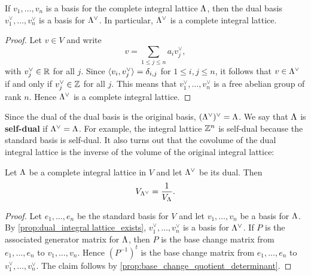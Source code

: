     \begin{proposition}\label{prop:dual_integral lattice_exists}
      If $v_{1},\ldots,v_{n}$ is a basis for the complete integral lattice $\Lambda$, then the dual basis $v_{1}^{\vee},\ldots,v_{n}^{\vee}$ is a basis for $\Lambda^{\vee}$. In particular, $\Lambda^{\vee}$ is a complete integral lattice.
    \end{proposition}
    \begin{proof}
      Let $v \in V$ and write
      \[
        v = \sum_{1 \le j \le n}a_{i}v_{j}^{\vee},
      \]
      with $v_{j}^{\vee} \in \mathbb{R}$ for all $j$. Since $\langle v_{i},v_{j}^{\vee}\rangle = \delta_{i,j}$ for $1 \le i,j \le n$, it follows that $v \in \Lambda^{\vee}$ if and only if $v_{j}^{\vee} \in \mathbb{Z}$ for all $j$. This means that $v_{1}^{\vee},\ldots,v_{n}^{\vee}$ is a free abelian group of rank $n$. Hence $\Lambda^{\vee}$ is a complete integral lattice.
    \end{proof}

    Since the dual of the dual basis is the original basis, $(\Lambda^{\vee})^{\vee} = \Lambda$. We say that $\Lambda$ is \textbf{self-dual} if $\Lambda^{\vee} = \Lambda$. For example, the integral lattice $\mathbb{Z}^{n}$ is self-dual because the standard basis is self-dual. It also turns out that the covolume of the dual integral lattice is the inverse of the volume of the original integral lattice:

    \begin{proposition}\label{prop:covolume_of_dual_is_inverse}
      Let $\Lambda$ be a complete integral lattice in $V$ and let $\Lambda^{\vee}$ be its dual. Then
      \[
        V_{\Lambda^{\vee}} = \frac{1}{V_{\Lambda}}.
      \]
    \end{proposition}
    \begin{proof}
      Let $e_{1},\ldots,e_{n}$ be the standard basis for $V$ and let $v_{1},\ldots,v_{n}$ be a basis for $\Lambda$. By \cref{prop:dual_integral lattice_exists}, $v_{1}^{\vee},\ldots,v_{n}^{\vee}$ is a basis for $\Lambda^{\vee}$. If $P$ is the associated generator matrix for $\Lambda$, then $P$ is the base change matrix from $e_{1},\ldots,e_{n}$ to $v_{1},\ldots,v_{n}$. Hence $(P^{-1})^{t}$ is the base change matrix from $e_{1},\ldots,e_{n}$ to $v_{1}^{\vee},\ldots,v_{n}^{\vee}$. The claim follows by \cref{prop:base_change_quotient_determinant}.
    \end{proof}
    
